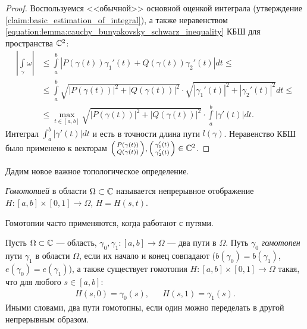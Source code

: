 \documentclass[../complex-analysis.tex]{subfiles}
\begin{document}
\begin{proof}
 Воспользуемся <<обычной>> основной оценкой интеграла (утверждение \ref{claim:basic_estimation_of_integral}), а также неравенством \eqref{equation:lemma:cauchy_bunyakovsky_schwarz_inequality} КБШ для пространства $\mathbb{C}^{2}$:
 \begin{align*}
  \left| \int\limits_{\gamma} \omega  \right| &\leqslant \int\limits_{a}^{b} \left| P(\gamma(t))\gamma_1'(t) + Q(\gamma(t))\gamma_2'(t) \right|dt \leqslant \\
  &\leqslant \int\limits_{a}^{b} \sqrt{\left| P(\gamma(t)) \right|^{2} + \left| Q(\gamma(t)) \right|^{2}} \cdot \sqrt{\left| \gamma_1'(t) \right|^{2} + \left| \gamma_2'(t) \right|^{2}} dt \leqslant \\
  &\leqslant \max_{t \in [a,b]} \sqrt{\left| P(\gamma(t)) \right|^{2} + \left| Q(\gamma(t)) \right|^{2}} \cdot \int\limits_{a}^{b} \left| \gamma'(t) \right|  dt
  .\end{align*} Интеграл $\int_{a}^{b} \left| \gamma'(t) \right|dt$ и есть в точности длина пути $l(\gamma)$. Неравенство КБШ было применено к векторам $ \begin{psmallmatrix}
  P(\gamma(t)) \\ Q(\gamma(t))
  \end{psmallmatrix}, \begin{psmallmatrix}
  \gamma_1'(t) \\ \gamma_2'(t)
 \end{psmallmatrix} \in \mathbb{C}^{2}$.
\end{proof}

Дадим новое важное топологическое определение.
\begin{df}[гомотопия]
 \textit{Гомотопией} в области $\Omega \subset \mathbb{C}$ называется непрерывное отображение $H \colon [a,b] \times [0,1] \to \Omega$, $H = H(s,t)$. 
\end{df}

Гомотопии часто применяются, когда работают с путями.

\begin{df}
 \label{definition:path-homotopy}
 Пусть $\Omega \subset \mathbb{C}$ --- область, $\gamma_0, \gamma_1\colon [a,b] \to \Omega$ --- два пути в $\Omega$. Путь $\gamma_0$ \textit{гомотопен} пути $\gamma_1$ в области $\Omega$, если их начало и конец совпадают ($b(\gamma_0) = b(\gamma_1)$, $e(\gamma_0) = e(\gamma_1)$), а также существует гомотопия $H \colon [a,b] \times [0,1] \to \Omega$  такая, что для любого $s \in [a,b]$:
 \begin{align*}
  H(s,0) = \gamma_0(s), & &H(s,1) = \gamma_1(s).
 \end{align*} Иными словами, два пути гомотопны, если один можно переделать в другой непрерывным образом.
\end{df}
\end{document}
